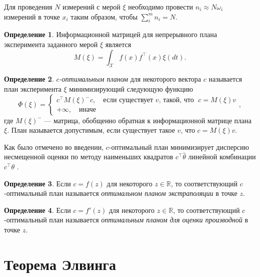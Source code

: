 \documentclass[specialist,
               substylefile = spbu.rtx,
               subf,href,colorlinks=true, 12pt]{disser}
\theoremstyle{definition}
\newtheorem{definition}{Определение}
\begin{document}
  Для проведения $N$ измерений с мерой $\xi$ необходимо провести $n_i \approx N \omega_i$ измерений в точке $x_i$ таким образом, чтобы $\sum^m_i n_i = N$.

  \begin{definition}
  Информационной матрицей для непрерывного плана эксперимента заданного мерой $\xi$ является 
  \begin{equation*}
    M(\xi) = \int_{\mathcal{X}} f(x) f^\top(x) \xi (dt).
  \end{equation*}
  \end{definition}
  
  \begin{definition}
  \label{def:coptim}
  \textit{$c$-оптимальным планом} для некоторого вектора $c$ называется план эксперимента $\xi$ минимизирующий следующую функцию
  \begin{equation*}
    \Phi(\xi) = \begin{cases}
      c^\top M(\xi)^{-} c, \quad \text{если существует } v \text{, такой, что } \; c = M(\xi) v\\
      +\infty, \quad  \text{иначе}
    \end{cases},
  \end{equation*}
  где $M(\xi)^{-}$ --- матрица, обобщенно обратная к информационной матрице плана $\xi$.
  План называется допустимым, если существует такое $v$, что $c = M(\xi) v$.
  \end{definition}
  
  Как было отмечено во введении, $c$-оптимальный план минимизирует дисперсию несмещенной оценки по методу наименьших квадратов $c^\top \hat{\theta}$ линейной комбинации $c^\top \theta$ \cite{dette1993_2}.
  
  \begin{definition}
  Если $c = f(z)$ для некоторого $z \in \mathbb{R}$, то соответствующий $c$-оптимальный план называется \textit{оптимальном планом экстраполяции} в точке $z$.
  \end{definition}
  
  \begin{definition}
  Если $c = f'(z)$ для некоторого $z \in \mathbb{R}$, то соответствующий $c$-оптимальный план называется \textit{оптимальным планом для оценки производной} в точке $z$.
  \end{definition}
  
  \section{Теорема Элвинга}
  
\end{document}

